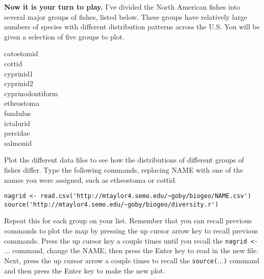 \documentclass[11pt]{article}
\begin{document}
\textbf{Now it is your turn to play.} I've divided the North American
fishes into several major groups of fishes, listed below. These groups
have relatively large numbers of species with different distribution
patterns across the U.S. You will be given a selection of five
groups to plot.

\begin{multicols}{2}
catostomid \\
cottid \\
cyprinid1 \\
cyprinid2 \\
cyprinodontiform \\
etheostoma \\
fundulus \\
ictalurid \\
percidae \\
salmonid
\end{multicols}
\newpage

Plot the different data files to see how the
distributions of different groups of fishes differ. Type the following
commands, replacing NAME with one of the names you were assigned, such as
etheostoma or cottid.

\begin{verbatim}
nagrid <- read.csv('http://mtaylor4.semo.edu/~goby/biogeo/NAME.csv')
source('http://mtaylor4.semo.edu/~goby/biogeo/diversity.r')
\end{verbatim}

Repeat this for each group on your list. Remember that you can recall
previous commands to plot the map by pressing the up cursor
arrow key to recall previous commands. Press the up cursor key a couple 
times until you recall the \texttt{nagrid \textless{}- $\ldots$} command, change the NAME,
then press the Enter key to read in the new file. Next, press the up cursor
arrow a couple times to recall the \texttt{source($\ldots$)} command and then
press the Enter key to make the new plot.
\end{document}
